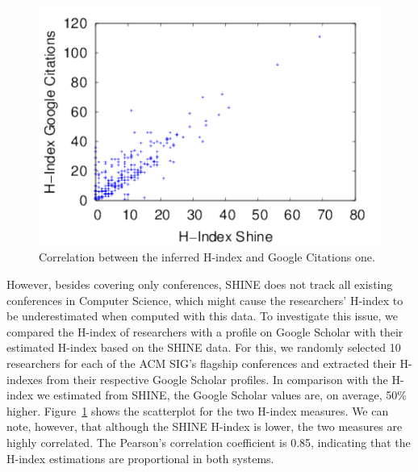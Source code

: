 \documentclass[smallextended]{svjour3}
\begin{document}
\begin{figure}[!htb]
\centering
 \includegraphics[width=.99\textwidth]{hindex_scatter_plot.pdf}
\caption{Correlation between the inferred H-index and Google Citations one.}
\label{fig:hindex_scatter_plot}
\end{figure}

However, besides covering only conferences, SHINE does not track all existing conferences in Computer Science, which might cause the researchers' H-index to be underestimated when computed with this data. To investigate this issue, we compared the H-index of researchers with a profile on Google Scholar with their estimated H-index based on the SHINE data. For this, we randomly selected 10 researchers for each of the ACM SIG's flagship conferences and extracted their H-indexes from their respective Google Scholar profiles. In comparison with the H-index we estimated from SHINE, the Google Scholar values are, on average, 50\% higher. Figure~\ref{fig:hindex_scatter_plot} shows the scatterplot for the two H-index measures. We can note, however, that although the SHINE H-index is lower, the two measures are highly correlated. The Pearson's correlation coefficient is 0.85, indicating that the H-index estimations are proportional in both systems.
\end{document}
